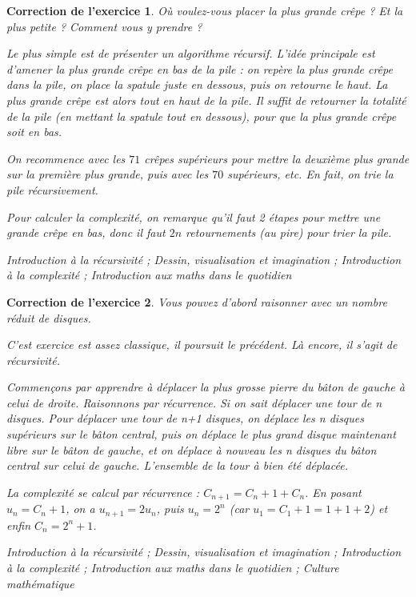 \documentclass[12pt]{article}
\theoremstyle{break}
\newtheorem{cor}{Correction de l'exercice}
\begin{document}
\begin{cor}
\textit{Où voulez-vous placer la plus grande crêpe ? Et la plus petite ? Comment vous y prendre ?}

Le plus simple est de présenter un algorithme récursif. L'idée principale est d'amener la plus grande crêpe en bas de la pile : on repère la plus grande crêpe dans la pile, on place la spatule juste en dessous, puis on retourne le haut. La plus grande crêpe est alors tout en haut de la pile. Il suffit de retourner la totalité de la pile (en mettant la spatule tout en dessous), pour que la plus grande crêpe soit en bas. 

On recommence avec les $71$ crêpes supérieurs pour mettre la deuxième plus grande sur la première plus grande, puis avec les $70$ supérieurs, etc. En fait, on trie la pile récursivement.

Pour calculer la complexité, on remarque qu'il faut 2 étapes pour mettre une grande crêpe en bas, donc il faut $2n$ retournements (au pire) pour trier la pile.

\textit{Introduction à la récursivité ; Dessin, visualisation et imagination ; Introduction à la complexité ; Introduction aux maths dans le quotidien}
\end{cor}


\begin{cor}
\textit{Vous pouvez d'abord raisonner avec un nombre réduit de disques.}

C'est exercice est assez classique, il poursuit le précédent. Là encore, il s'agit de récursivité.

Commençons par apprendre à déplacer la plus grosse pierre du bâton de gauche à celui de droite. Raisonnons par récurrence. Si on sait déplacer une tour de n disques. Pour déplacer une tour de n+1 disques, on déplace les n disques supérieurs sur le bâton central, puis on déplace le plus grand disque maintenant libre sur le bâton de gauche, et on déplace à nouveau les n disques du bâton central sur celui de gauche. L'ensemble de la tour à bien été déplacée.

La complexité se calcul par récurrence : $C_{n+1} = C_n + 1 + C_n$. En posant $u_n = C_n + 1$, on a $u_{n+1} = 2u_n$, puis $u_n = 2^n$ (car $u_1 = C_1 + 1 = 1+1 + 2$) et enfin $C_n = 2^n + 1$.\newline 

\textit{Introduction à la récursivité ; Dessin, visualisation et imagination ; Introduction à la complexité ; Introduction aux maths dans le quotidien ; Culture mathématique}
\end{cor}
\end{document}
